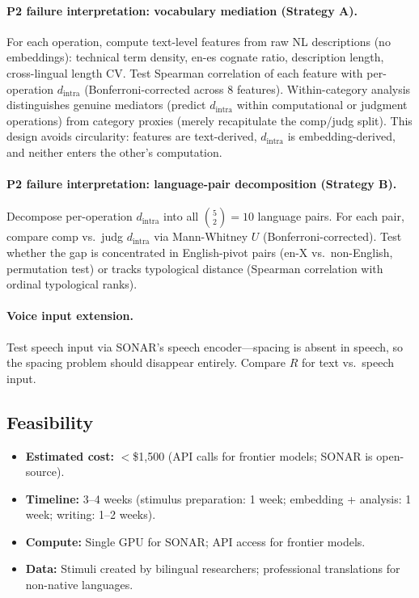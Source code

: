 \documentclass[11pt]{article}
\theoremstyle{definition}
\begin{document}
\paragraph{P2 failure interpretation: vocabulary mediation (Strategy A).}
For each operation, compute text-level features from raw NL descriptions (no embeddings): technical term density, en-es cognate ratio, description length, cross-lingual length CV. Test Spearman correlation of each feature with per-operation $d_{\text{intra}}$ (Bonferroni-corrected across 8 features). Within-category analysis distinguishes genuine mediators (predict $d_{\text{intra}}$ within computational or judgment operations) from category proxies (merely recapitulate the comp/judg split). This design avoids circularity: features are text-derived, $d_{\text{intra}}$ is embedding-derived, and neither enters the other's computation.

\paragraph{P2 failure interpretation: language-pair decomposition (Strategy B).}
Decompose per-operation $d_{\text{intra}}$ into all $\binom{5}{2} = 10$ language pairs. For each pair, compare comp vs.\ judg $d_{\text{intra}}$ via Mann-Whitney $U$ (Bonferroni-corrected). Test whether the gap is concentrated in English-pivot pairs (en-X vs.\ non-English, permutation test) or tracks typological distance (Spearman correlation with ordinal typological ranks).

\paragraph{Voice input extension.}
Test speech input via SONAR's speech encoder---spacing is absent in speech, so the spacing problem should disappear entirely. Compare $R$ for text vs.\ speech input.

\subsection{Feasibility}

\begin{itemize}[nosep]
  \item \textbf{Estimated cost:} $<$\$1{,}500 (API calls for frontier models; SONAR is open-source).
  \item \textbf{Timeline:} 3--4 weeks (stimulus preparation: 1 week; embedding + analysis: 1 week; writing: 1--2 weeks).
  \item \textbf{Compute:} Single GPU for SONAR; API access for frontier models.
  \item \textbf{Data:} Stimuli created by bilingual researchers; professional translations for non-native languages.
\end{itemize}
\end{document}
